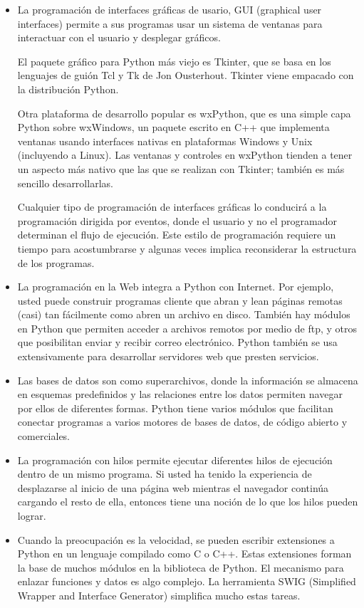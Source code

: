 \begin{itemize}

\item La programación de interfaces gráficas de usario, GUI (graphical user interfaces)
permite a sus programas usar un sistema de ventanas para interactuar con el usuario
y desplegar gráficos.

El paquete gráfico para Python más viejo es Tkinter, que se basa en los lenguajes
de guión Tcl y Tk de  Jon Ousterhout. Tkinter viene empacado con la
distribución Python.

Otra plataforma de desarrollo popular es  wxPython, que es una simple capa Python sobre
wxWindows, un paquete escrito en  C++ que implementa ventanas usando 
interfaces nativas en plataformas  Windows y Unix (incluyendo a Linux). 
Las ventanas y controles en wxPython tienden a tener un aspecto más nativo
que las que se realizan con Tkinter; también es más sencillo desarrollarlas.

Cualquier tipo de programación de interfaces gráficas lo conducirá a la
programación dirigida por eventos, donde el usuario y no el programador
determinan el flujo de ejecución. Este estilo de programación requiere
un tiempo para acostumbrarse y algunas veces implica reconsiderar la
estructura de los programas.

\item La programación en la Web integra a Python con Internet. Por ejemplo,
usted puede construir programas cliente que abran y lean  páginas
remotas (casi) tan fácilmente como abren un archivo en disco. También 
hay módulos en Python que permiten acceder a archivos remotos por medio
de ftp, y otros que posibilitan enviar y recibir correo electrónico. Python
también se usa extensivamente para desarrollar servidores web que
presten servicios.



\item Las bases de datos son como superarchivos, donde la información
se almacena en esquemas predefinidos y las relaciones entre los 
datos permiten navegar por ellos de diferentes formas. Python tiene
varios módulos que facilitan conectar programas a varios motores de
bases de datos, de código abierto y comerciales.

\item La programación con hilos permite ejecutar diferentes hilos
de ejecución dentro de un mismo programa. Si usted ha tenido la 
experiencia de desplazarse al inicio de una página web mientras 
el navegador continúa cargando el resto de ella, entonces tiene
una noción de lo que los hilos pueden lograr.

\item Cuando la preocupación es la velocidad, se pueden escribir
extensiones a Python en un lenguaje compilado como C o C++. Estas
extensiones forman la base de muchos módulos en la biblioteca de
Python. El mecanismo para enlazar funciones y datos es algo 
complejo. La herramienta SWIG (Simplified Wrapper and Interface Generator)
simplifica mucho estas tareas.
\end{itemize}


